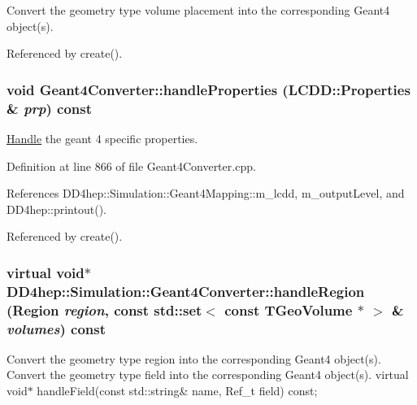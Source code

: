 Convert the geometry type volume placement into the corresponding Geant4 object(s). 

Referenced by create().\hypertarget{class_d_d4hep_1_1_simulation_1_1_geant4_converter_a18399813135c4547ae465e75dc620a8f}{
\subsubsection[{handleProperties}]{\setlength{\rightskip}{0pt plus 5cm}void Geant4Converter::handleProperties ({\bf LCDD::Properties} \& {\em prp}) const}}
\label{class_d_d4hep_1_1_simulation_1_1_geant4_converter_a18399813135c4547ae465e75dc620a8f}


\hyperlink{class_d_d4hep_1_1_handle}{Handle} the geant 4 specific properties. 

Definition at line 866 of file Geant4Converter.cpp.

References DD4hep::Simulation::Geant4Mapping::m\_\-lcdd, m\_\-outputLevel, and DD4hep::printout().

Referenced by create().\hypertarget{class_d_d4hep_1_1_simulation_1_1_geant4_converter_aa64bdf48bc89f2af20a5470f0440a59a}{
\subsubsection[{handleRegion}]{\setlength{\rightskip}{0pt plus 5cm}virtual void$\ast$ DD4hep::Simulation::Geant4Converter::handleRegion ({\bf Region} {\em region}, \/  const std::set$<$ const TGeoVolume $\ast$ $>$ \& {\em volumes}) const}}
\label{class_d_d4hep_1_1_simulation_1_1_geant4_converter_aa64bdf48bc89f2af20a5470f0440a59a}


Convert the geometry type region into the corresponding Geant4 object(s). Convert the geometry type field into the corresponding Geant4 object(s). virtual void$\ast$ handleField(const std::string\& name, Ref\_\-t field) const; 

